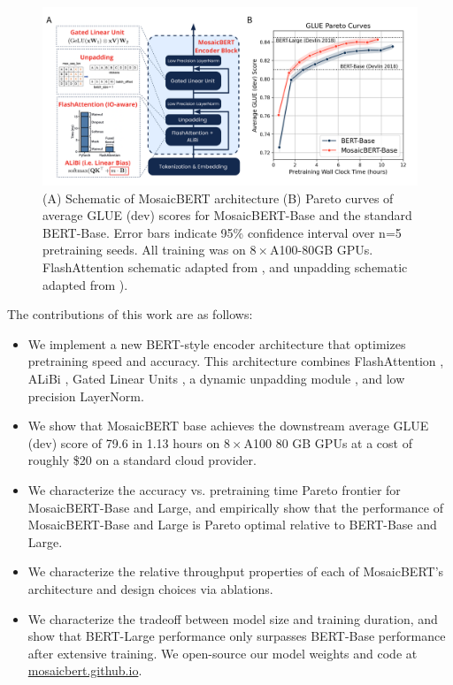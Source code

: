 \documentclass{article}
\begin{document}







\begin{figure}
    \centering
    \includegraphics[width=\textwidth]{figures/Figure-1-high-res-12-29-1217am.png}
    \caption{(A) Schematic of MosaicBERT architecture (B) Pareto curves of average GLUE (dev) scores for MosaicBERT-Base and the standard BERT-Base.  Error bars indicate 95\% confidence interval over n=5 pretraining seeds. All training was on $8\times$A100-80GB GPUs. FlashAttention schematic adapted from \cite{dao2022flashattention}, and unpadding schematic adapted from \cite{zeng2022boosting}).}
    \label{fig:intro_figure}
\end{figure}
The contributions of this work are as follows:
\begin{itemize}
    \item We implement a new BERT-style encoder architecture that optimizes pretraining speed and accuracy. This architecture combines FlashAttention \citep{dao2022flashattention}, ALiBi \citep{press2021train}, Gated Linear Units \citep{dauphin2017language,shazeer2020glu}, a dynamic unpadding module \citep{zeng2022boosting}, and low precision LayerNorm.
    \item We show that MosaicBERT base achieves the downstream average GLUE (dev) score of 79.6 in 1.13 hours on $8\times$A100 80 GB GPUs at a cost of roughly \$20 on a standard cloud provider.
    \item We characterize the accuracy vs. pretraining time Pareto frontier for MosaicBERT-Base and Large, and empirically show that the performance of MosaicBERT-Base and Large is Pareto optimal relative to BERT-Base and Large.
    \item We characterize the relative throughput properties of each of MosaicBERT's architecture and design choices via ablations.
    \item  We characterize the tradeoff between model size and training duration, and show that BERT-Large performance only surpasses BERT-Base performance after extensive training. We open-source our model weights and code at \href{https://mosaicbert.github.io}{\url{mosaicbert.github.io}}.
\end{itemize}
\end{document}
